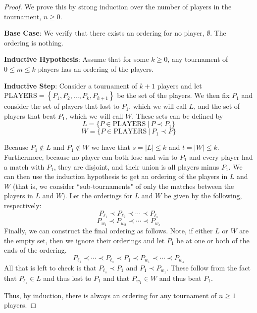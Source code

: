 \documentclass{article}
\theoremstyle{plain}
\theoremstyle{definition}
\begin{document}
\begin{proof}
    We prove this by strong induction over the number of players in the tournament, \(n \geq 0\).
    
    \textbf{Base Case}: We verify that there exists an ordering for no player, \(\emptyset\). The ordering is nothing.

    \textbf{Inductive Hypothesis}: Assume that for some \(k \geq 0\), any tournament of \(0 \leq m \leq k\) players has an ordering of the players.

    \textbf{Inductive Step}: Consider a tournament of \(k+1\) players and let \(\text{PLAYERS} = \left\{P_1, P_2, \dotsc, P_k, P_{k+1}\right\}\) be the set of the players. We then fix \(P_1\) and consider the set of players that lost to \(P_1\), which we will call \(L\), and the set of players that beat \(P_1\), which we will call \(W\). These sets can be defined by 
    \[L = \{P \in \text{PLAYERS}\ |\ P \prec P_1\}\]
    \[W = \{P \in \text{PLAYERS}\ |\ P_1 \prec P\}\]

    Because \(P_1 \notin L\) and \(P_1 \notin W\) we have that \(s = |L| \leq k\) and \(t = |W| \leq k\). Furthermore, because no player can both lose and win to \(P_1\) and every player had a match with \(P_1\), they are disjoint, and their union is all players minus \(P_1\). We can then use the induction hypothesis to get an ordering of the players in \(L\) and \(W\) (that is, we consider ``sub-tournaments" of only the matches between the players in \(L\) and \(W\)). Let the orderings for \(L\) and \(W\) be given by the following, respectively:
    \[P_{\ell_1} \prec P_{\ell_2} \prec \cdots \prec P_{\ell_s}\]
    \[P_{w_1} \prec P_{w_2} \prec \cdots \prec P_{w_s}\]
    Finally, we can construct the final ordering as follows. Note, if either \(L\) or \(W\) are the empty set, then we ignore their orderings and let \(P_1\) be at one or both of the ends of the ordering.
    \[P_{\ell_1} \prec \cdots \prec P_{\ell_s} \prec P_1 \prec P_{w_1} \prec \cdots \prec P_{w_s}\]
    All that is left to check is that \(P_{\ell_s} \prec P_1\) and \(P_1 \prec P_{w_1}\). These follow from the fact that \(P_{\ell_s} \in L\) and thus lost to \(P_1\) and that \(P_{w_1} \in W\) and thus beat \(P_1\).

    Thus, by induction, there is always an ordering for any tournament of \(n \geq 1\) players.
\end{proof}
\end{document}
